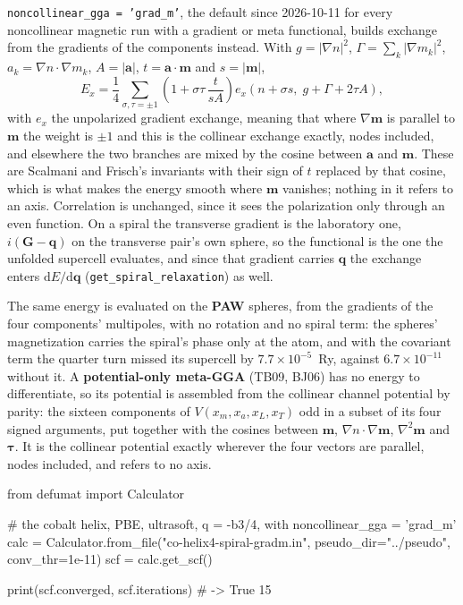 \documentclass[11pt,a4paper]{article}
\newcommand{\code}[1]{\texttt{\small #1}}
\begin{document}
\code{noncollinear\_gga = 'grad\_m'}, the default since 2026-10-11 for every
noncollinear magnetic run with a gradient or meta functional, builds exchange from the
gradients of the components instead. With $g = |\nabla n|^2$,
$\Gamma = \sum_k|\nabla m_k|^2$, $a_k = \nabla n\cdot\nabla m_k$, $A = |\mathbf a|$,
$t = \mathbf a\cdot\mathbf m$ and $s = |\mathbf m|$,
\begin{equation*}
E_x = \frac14\sum_{\sigma,\tau=\pm1}\left(1 + \sigma\tau\,\frac{t}{sA}\right)
e_x\!\left(n + \sigma s,\; g + \Gamma + 2\tau A\right),
\end{equation*}
with $e_x$ the unpolarized gradient exchange, meaning that where $\nabla\mathbf m$
is parallel to $\mathbf m$ the weight is $\pm1$ and this is the collinear exchange
exactly, nodes included, and elsewhere the two branches are mixed by the cosine
between $\mathbf a$ and $\mathbf m$. These are Scalmani and Frisch's invariants
with their sign of $t$ replaced by that cosine, which is what makes the energy
smooth where $\mathbf m$ vanishes; nothing in it refers to an axis. Correlation
is unchanged, since it sees the polarization only through an even function. On a
spiral the transverse gradient is the laboratory one, $i(\mathbf G - \mathbf q)$
on the transverse pair's own sphere, so the functional is the one the unfolded
supercell evaluates, and since that gradient carries $\mathbf q$ the exchange enters
$\mathrm dE/\mathrm d\mathbf q$ (\code{get\_spiral\_relaxation}) as well.

The same energy is evaluated on the \textbf{PAW} spheres, from the gradients of the four
components' multipoles, with no rotation and no spiral term: the spheres' magnetization
carries the spiral's phase only at the atom, and with the covariant term the quarter turn
missed its supercell by $7.7\times10^{-5}$~Ry, against $6.7\times10^{-11}$ without it. A
\textbf{potential-only meta-GGA} (TB09, BJ06) has no energy to differentiate, so its
potential is assembled from the collinear channel potential by parity: the sixteen
components of $V(x_m, x_a, x_L, x_T)$ odd in a subset of its four signed arguments, put
together with the cosines between $\mathbf m$, $\nabla n\cdot\nabla\mathbf m$,
$\nabla^2\mathbf m$ and $\boldsymbol\tau$. It is the collinear potential exactly
wherever the four vectors are parallel, nodes included, and refers to no axis.

\begin{pycode}
from defumat import Calculator

# the cobalt helix, PBE, ultrasoft, q = -b3/4, with noncollinear_gga = 'grad_m'
calc = Calculator.from_file("co-helix4-spiral-gradm.in", pseudo_dir="../pseudo",
                            conv_thr=1e-11)
scf = calc.get_scf()

print(scf.converged, scf.iterations)   # -> True 15
\end{pycode}
\end{document}
